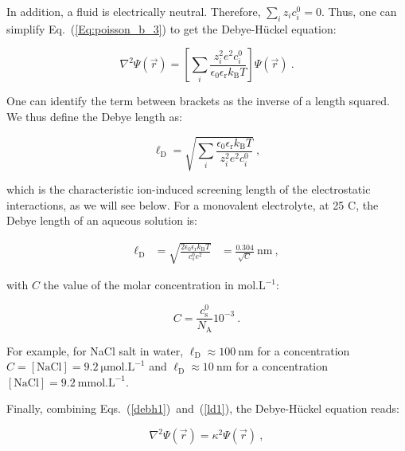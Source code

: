 In addition, a fluid is electrically neutral. Therefore, $\sum_i z_i c_i^0 = 0$. Thus, one can simplify Eq.~(\ref{Eq:poisson_b_3}) to get the Debye-Hückel equation:

\begin{equation}
	\nabla^2 \Psi (\vec{r}) = \left[  \sum_i \frac{z_i ^2 e^2 c_i^0}{\epsilon_0 \epsilon_\mathrm{r}  k_\mathrm{B} T}    \right] \Psi (\vec{r}) ~.
	\label{debh1}
\end{equation}

One can identify the term between brackets as the inverse of a length squared. We thus define the Debye length as:

\begin{equation}
	\ell _\mathrm{D} =  \sqrt{ \sum_i\frac {\epsilon_0 \epsilon_\mathrm{r} k_\mathrm{B} T} {z_i ^2 e^2 c_i^0}} ~,
	\label{ld1}
\end{equation}

which is the characteristic ion-induced screening length of the electrostatic interactions, as we will see below. For a monovalent electrolyte,  at 25 \textdegree C, the Debye length of an aqueous solution is:

\begin{equation}
	\begin{aligned}
		\ell _\mathrm{D} &= \sqrt{\frac{ 2 \epsilon_0 \epsilon_\mathrm{r} k_\mathrm{B}T}{c_s^0 e^2}}
		& = \frac{0.304 }{ \sqrt{C} } ~\mathrm{nm} ~,
	\end{aligned}
\end{equation}


with $C$ the value of the molar concentration in $\mathrm{mol.L^{-1}}$:

\begin{equation}
	C = \frac{c_\mathrm{s} ^0}{N_\mathrm{A}} 10^{-3} ~. 
\end{equation}


For example, for NaCl salt in water,  $\ell_\mathrm{D} \approx 100 ~ \mathrm{nm}$ for a concentration  $C = [\mathrm{NaCl}] = 9.2 ~ \mathrm{\mu mol.L^{-1}}$ and   $\ell_\mathrm{D} \approx 10 ~  \mathrm{nm}$ for a concentration  $[\mathrm{NaCl}] = 9.2 ~ \mathrm{mmol.L^{-1}}$.



Finally, combining Eqs.~(\ref{debh1})~and~(\ref{ld1}),  the Debye-Hückel equation reads:

\begin{equation}
	\nabla^2 \Psi (\vec{r}) = \kappa^2  \Psi (\vec{r}) ~,
	\label{Eq:Debye_hu}
\end{equation}

